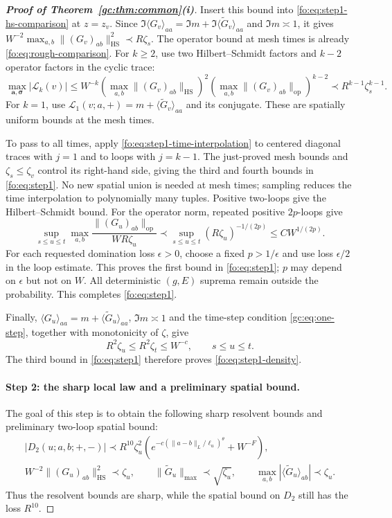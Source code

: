 \documentclass[11pt]{article}
\numberwithin{equation}{section}
\theoremstyle{remark}
\newcommand{\wt}{\widetilde}
\newcommand{\cL}{\mathcal L}
\newcommand{\op}{\mathrm{op}}
\newcommand{\HS}{\mathrm{HS}}
\begin{document}
\begin{proof}[\textbf{Proof of Theorem~\ref{gc:thm:common}(i)}]
Insert this bound into \eqref{fo:eq:step1-hs-comparison} at $z=z_v$.
Since $\Im\langle G_v\rangle_{aa}=\Im m+
\Im\langle\wt G_v\rangle_{aa}$ and $\Im m\asymp1$, it gives
$W^{-2}\max_{a,b}\|(G_v)_{ab}\|_{\HS}^2\prec R\zeta_s$.
The operator bound at mesh times is already \eqref{fo:eq:rough-comparison}.
For $k\ge2$, use two Hilbert--Schmidt factors and $k-2$ operator factors
in the cyclic trace:
\[
 \max_{\boldsymbol a,\boldsymbol\sigma}|\cL_k(v)|
 \le W^{-k}\left(\max_{a,b}\|(G_v)_{ab}\|_{\HS}\right)^2
                \left(\max_{a,b}\|(G_v)_{ab}\|_{\op}\right)^{k-2}
 \prec R^{k-1}\zeta_s^{k-1}.
\]
For $k=1$, use $\cL_1(v;a,+)=m+\langle\wt G_v\rangle_{aa}$
and its conjugate. These are spatially uniform bounds at the mesh times.

To pass to all times, apply \eqref{fo:eq:step1-time-interpolation} to
centered diagonal traces with $j=1$ and to loops with $j=k-1$.
The just-proved mesh bounds and $\zeta_s\le\zeta_v$ control its right-hand
side, giving the third and fourth bounds in \eqref{fo:eq:step1}.
No new spatial union is needed at mesh times; sampling reduces the
time interpolation to polynomially many tuples. Positive two-loops give
the Hilbert--Schmidt bound. For the operator norm, repeated positive
$2p$-loops give
\[
 \sup_{s\le u\le t}\max_{a,b}
 \frac{\|(G_u)_{ab}\|_{\op}}{WR\zeta_u}
 \prec\sup_{s\le u\le t}(R\zeta_u)^{-1/(2p)}
 \le CW^{1/(2p)}.
\]
For each requested domination loss $\epsilon>0$, choose a fixed
$p>1/\epsilon$ and use loss $\epsilon/2$ in the loop estimate.
This proves the first bound in \eqref{fo:eq:step1}; $p$ may depend on
$\epsilon$ but not on $W$. All deterministic $(g,E)$ suprema remain
outside the probability. This completes \eqref{fo:eq:step1}.

Finally, $\langle G_u\rangle_{aa}=m+\langle\wt G_u\rangle_{aa}$,
$\Im m\asymp1$ and the time-step condition \eqref{gc:eq:one-step},
together with monotonicity of $\zeta$, give
\[
 R^2\zeta_u\le R^2\zeta_t\le W^{-c},\qquad s\le u\le t.
\]
The third bound in \eqref{fo:eq:step1} therefore proves
\eqref{fo:eq:step1-density}.

\paragraph{Step 2: the sharp local law and a preliminary spatial bound.}
The goal of this step is to obtain the following sharp resolvent bounds
and preliminary two-loop spatial bound:
\begin{equation}\label{fo:eq:step2}
 \begin{gathered}
 |D_2(u;a,b;+,-)|\prec R^{10}\zeta_u^2
       \left(e^{-c(\|a-b\|_L/\ell_u)^\theta}+W^{-F}\right),\\
 W^{-2}\|(G_u)_{ab}\|_{\HS}^2\prec\zeta_u,\qquad
 \|\wt G_u\|_{\max}\prec\sqrt{\zeta_u},\qquad
 \max_{a,b}|\langle\wt G_u\rangle_{ab}|\prec\zeta_u.
 \end{gathered}
\end{equation}
Thus the resolvent bounds are sharp, while the spatial bound on $D_2$
still has the loss $R^{10}$.


\end{proof}
\end{document}
